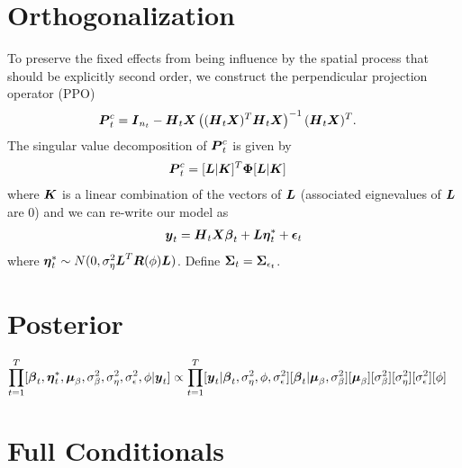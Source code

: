 \documentclass[fleqn]{article}
\def\bm#1{\mbox{\boldmath $#1$}}
\begin{document}
\section{Orthogonalization}
%
To preserve the fixed effects from being influence by the spatial process that should be explicitly second order, we construct the perpendicular projection operator (PPO) 
\begin{align*}
\bm{P}^c_t & = \bm{I}_{n_t} - \bm{H}_t \bm{X}\left( (\bm{H}_t \bm{X})^T \bm{H}_t \bm{X} \right)^{ - 1} (\bm{H}_t \bm{X})^T. 
\end{align*}
%
The singular value decomposition of $\bm{P}^c_t$ is given by
\begin{align*}
\bm{P}^c_t & = [\bm{L} | \bm{K}]^T \bm{\Phi} [\bm{L} | \bm{K}]
\end{align*}
%
where $\bm{K}$ is a linear combination of the vectors of $\bm{L}$ (associated eignevalues of $\bm{L}$ are 0) and we can re-write our model as
\begin{align*}
\bm{y}_t & = \bm{H}_t \bm{X} \bm{\beta}_t + \bm{L} \bm{\eta}^*_t + \bm{\epsilon}_t\\
\end{align*}
where $\bm{\eta}^*_t \sim N(0, \sigma^2_{\eta} \bm{L}^T \bm{R}(\phi) \bm{L})$. Define $\bm{\Sigma}_t = \bm{\Sigma}_{\epsilon_t}$.
%
\section{Posterior}
%
\begin{align*}
\prod_{t = 1}^T [\bm{\beta}_t, \bm{\eta}^*_t, \bm{\mu}_\beta, \sigma^2_\beta, \sigma^2_\eta, \sigma^2_\epsilon, \phi | \bm{y}_t] & \propto \prod_{t = 1}^T [\bm{y}_t | \bm{\beta}_t, \sigma^2_\eta, \phi, \sigma^2_\epsilon] [\bm{\beta}_t | \bm{\mu}_\beta, \sigma^2_\beta] [\bm{\mu}_\beta] [\sigma^2_\beta] [\sigma^2_\eta] [\sigma^2_\epsilon] [\phi]
\end{align*}
%
\section{Full Conditionals}
%
\end{document}
